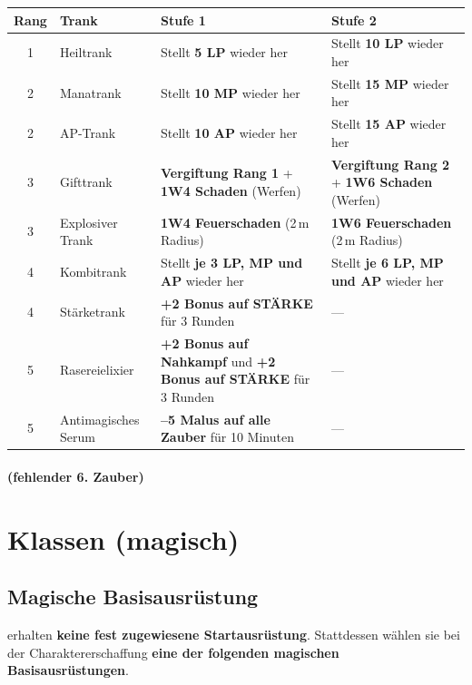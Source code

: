 \begin{center}
	\begin{tabularx}{\linewidth}{c l X X}
		\toprule
		\textbf{Rang} &
		\textbf{Trank} &
		\textbf{Stufe 1 } &
		\textbf{Stufe 2 } \\
		\midrule
		1 &
		Heiltrank &
		Stellt \textbf{5 LP} wieder her &
		Stellt \textbf{10 LP} wieder her \\
		\midrule
		2 &
		Manatrank &
		Stellt \textbf{10 MP} wieder her &
		Stellt \textbf{15 MP} wieder her \\
		2 &
		AP-Trank &
		Stellt \textbf{10 AP} wieder her &
		Stellt \textbf{15 AP} wieder her \\
		\midrule
		3 &
		Gifttrank &
		\textbf{Vergiftung Rang 1} + \textbf{1W4 Schaden} (Werfen) &
		\textbf{Vergiftung Rang 2} + \textbf{1W6 Schaden} (Werfen) \\
		3 &
		Explosiver Trank &
		\textbf{1W4 Feuerschaden} (2\,m Radius) &
		\textbf{1W6 Feuerschaden} (2\,m Radius) \\
		\midrule
		4 &
		Kombitrank &
		Stellt \textbf{je 3 LP, MP und AP} wieder her &
		Stellt \textbf{je 6 LP, MP und AP} wieder her \\
		4 &
		Stärketrank &
		\textbf{+2 Bonus auf STÄRKE} für 3 Runden &
		— \\
		\midrule
		5 &
		Rasereielixier &
		\textbf{+2 Bonus auf Nahkampf} und \textbf{+2 Bonus auf STÄRKE} für 3 Runden &
		— \\
		5 &
		Antimagisches Serum &
		\textbf{–5 Malus auf alle Zauber} für 10 Minuten &
		— \\
		\bottomrule
	\end{tabularx}
\end{center}

\paragraph*{(fehlender 6. Zauber)}

\section{Klassen (magisch)}
\subsection{Magische Basisausrüstung}

 erhalten \textbf{keine fest zugewiesene Startausrüstung}.
Stattdessen wählen sie bei der Charaktererschaffung
\textbf{eine der folgenden magischen Basisausrüstungen}.

